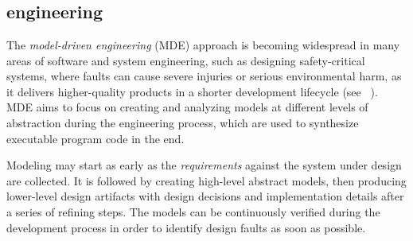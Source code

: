 
\chapter{\bevezeto}%




\section{\Modeldriven engineering}



The \emph{model-driven engineering} (MDE) approach is becoming widespread in many areas of software and system engineering, such as designing safety-critical systems, where faults can cause severe injuries or serious environmental harm, as it delivers higher-quality products in a shorter development lifecycle (see \eg~\cite{DBLP:journals/scp/HutchinsonWR14}). MDE aims to focus on creating and analyzing models at different levels of abstraction during the engineering process, which are used to synthesize executable program code in the end.

Modeling may start as early as the \emph{requirements} against the system under design are collected. It is followed by creating high-level abstract models, then producing lower-level design artifacts with design decisions and implementation details after a series of refining steps. The models can be continuously verified during the development process in order to identify design faults as soon as possible.

%

